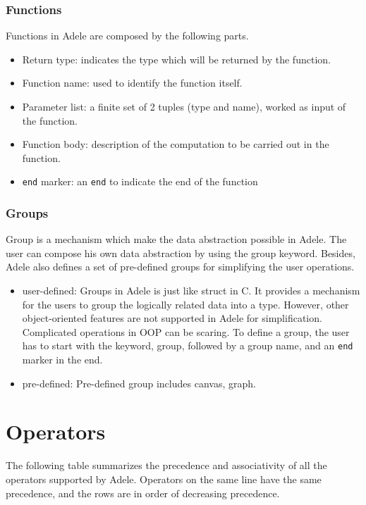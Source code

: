 \documentclass[11pt,letterpaper]{article}
\begin{document}
\subsubsection*{Functions} 
Functions in Adele are composed by the following parts.
	\begin{itemize}
		\item Return type: indicates the type which will be returned by the function.
		\item Function name: used to identify the function itself.
		\item Parameter list: a finite set of 2 tuples (type and name), worked as input of the function.
		\item Function body: description of the computation to be carried out in the function.
		\item \texttt{end} marker: an \texttt{end} to indicate the end of the function
	\end{itemize}
	
\subsubsection*{Groups}

Group is a mechanism which make the data abstraction possible in Adele. The user can compose his own data abstraction by using the group keyword. Besides, Adele also defines a set of pre-defined groups for simplifying the user operations.
	\begin{itemize}
		\item user-defined: Groups in Adele is just like struct in C. It provides a mechanism for the users to group the logically related 	data into a type. However, other object-oriented features are not supported in Adele for simplification. Complicated operations in OOP can be scaring. To define a group, the user has to start with the keyword, group, followed by a group name, and an \texttt{end} marker in the end.
		\item pre-defined: Pre-defined group includes canvas, graph.
	\end{itemize}

\section {Operators}
The following table summarizes the precedence and associativity of all the operators supported by Adele. Operators on the same line have the same precedence, and the rows are in order of decreasing precedence.
\end{document}
